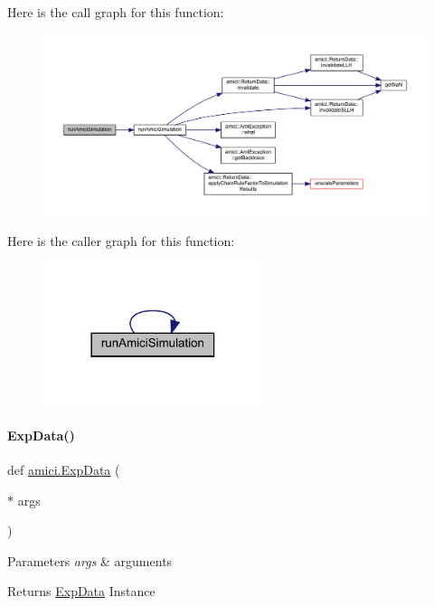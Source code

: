 Here is the call graph for this function\+:
\nopagebreak
\begin{figure}[H]
\begin{center}
\leavevmode
\includegraphics[width=350pt]{namespaceamici_a9501315e2c79e5787a62c57c05ffe7c0_cgraph}
\end{center}
\end{figure}
Here is the caller graph for this function\+:
\nopagebreak
\begin{figure}[H]
\begin{center}
\leavevmode
\includegraphics[width=182pt]{namespaceamici_a9501315e2c79e5787a62c57c05ffe7c0_icgraph}
\end{center}
\end{figure}
\mbox{\label{namespaceamici_a6afba639d40149cce5a00978bd922ba1}} 
\paragraph{\texorpdfstring{ExpData()}{ExpData()}}
{\footnotesize\ttfamily def \mbox{\hyperlink{classamici_1_1_exp_data}{amici.\+Exp\+Data}} (\begin{DoxyParamCaption}\item[{$\ast$}]{args }\end{DoxyParamCaption})}


\begin{DoxyParams}{Parameters}
{\em args} & arguments\\
\hline
\end{DoxyParams}
\begin{DoxyReturn}{Returns}
\mbox{\hyperlink{classamici_1_1_exp_data}{Exp\+Data}} Instance 
\end{DoxyReturn}


